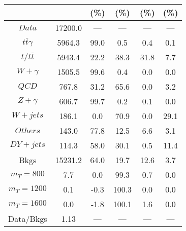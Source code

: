 \begin{figure}
\begin{minipage}[c]{0.32\textwidth}
{\begin{tabular}{cccccc}
 &  & (\%) & (\%) & (\%) & (\%)  \\
\hline
                                                                      $ Data $ &  17200.0 &  --- &  --- &  --- &  ---\\
$ t\bar{t}\gamma $ &  5964.3 &  99.0 &  0.5 &  0.4 &  0.1\\
$ t/t\bar{t} $ &  5943.4 &  22.2 &  38.3 &  31.8 &  7.7\\
$ W+\gamma $ &  1505.5 &  99.6 &  0.4 &  0.0 &  0.0\\
$ QCD $ &  767.8 &  31.2 &  65.6 &  0.0 &  3.2\\
$ Z+\gamma $ &  606.7 &  99.7 &  0.2 &  0.1 &  0.0\\
$ W+jets $ &  186.1 &  0.0 &  70.9 &  0.0 &  29.1\\
$ Others $ &  143.0 &  77.8 &  12.5 &  6.6 &  3.1\\
$ DY+jets $ &  114.3 &  58.0 &  30.1 &  0.5 &  11.4\\
Bkgs &  15231.2 &  64.0 &  19.7 &  12.6 &  3.7\\
$ m_{T} = 800 $ &  7.7 &  0.0 &  99.3 &  0.7 &  0.0\\
$ m_{T} = 1200 $ &  0.1 &  -0.3 &  100.3 &  0.0 &  0.0\\
$ m_{T} = 1600 $ &  0.0 &  -1.8 &  100.1 &  1.6 &  0.0\\
Data/Bkgs &  1.13 &  --- &  --- &  --- &  ---\\
\hline
\end{tabular}
}
\end{minipage}
\end{figure}

